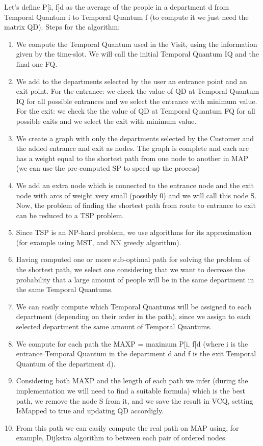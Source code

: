 \documentclass[a4paper, 12pt, oneside, table]{article}
\begin{document}
Let's define P[i, f]d as the average of the people in a department d from Temporal Quantum i to Temporal Quantum f (to compute it we just need the matrix QD).\newline
Steps for the algorithm:
\begin{enumerate}
    \item We compute the Temporal Quantum used in the Visit, using the information given by the time-slot. We will call the initial Temporal Quantum IQ and the final one FQ.
    \item We add to the departments selected by the user an entrance point and an exit point. For the entrance: we check the value of QD at Temporal Quantum IQ for all possible entrances and we select the entrance with minimum value. For the exit: we check the the value of QD at Temporal Quantum FQ for all possible exits and we select the exit with minimum value.
    \item We create a graph with only the departments selected by the Customer and the added entrance and exit as nodes. The graph is complete and each arc has a weight equal to the shortest path from one node to another in MAP (we can use the pre-computed SP to speed up the process)
    \item We add an extra node which is connected to the entrance node and the exit node with arcs of weight very small (possibly 0) and we will call this node S. Now, the problem of finding the shortest path from route to entrance to exit can be reduced to a TSP problem.
    \item Since TSP is an NP-hard problem, we use algorithms for its approximation (for example using MST, and NN greedy algorithm).
    \item Having computed one or more sub-optimal path for solving the problem of the shortest path, we select one considering that we want to decrease the probability that a large amount of people will be in the same department in the same Temporal Quantums.
    \item We can easily compute which Temporal Quantums will be assigned to each department (depending on their order in the path), since we assign to each selected department the same amount of Temporal Quantums.
    \item We compute for each path the MAXP = maximum P[i, f]d (where i is the entrance Temporal Quantum in the department d and f is the exit Temporal Quantum of the department d).
    \item Considering both MAXP and the length of each path we infer (during the implementation we will need to find a suitable formula) which is the best path, we remove the node S from it, and we save the result in VCQ, setting IsMapped to true and updating QD accordigly.
    \item From this path we can easily compute the real path on MAP using, for example, Dijkstra algorithm to between each pair of ordered nodes.
\end{enumerate}
\end{document}
